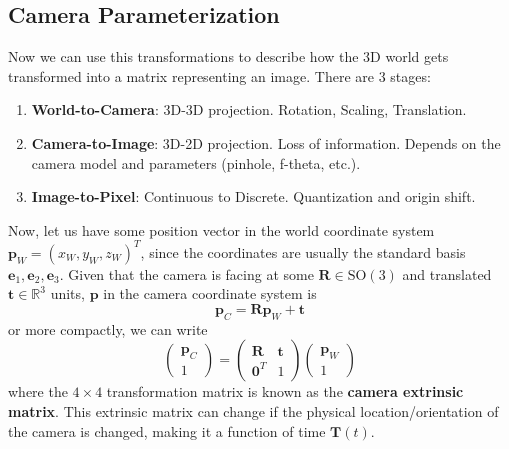 \documentclass{article}
\theoremstyle{definition}
\theoremstyle{remark}
\theoremstyle{definition}
\begin{document}
\subsection{Camera Parameterization}

Now we can use this transformations to describe how the 3D world gets transformed into a matrix representing an image. There are 3 stages: 
\begin{enumerate}
    \item \textbf{World-to-Camera}: 3D-3D projection. Rotation, Scaling, Translation. 
    \item \textbf{Camera-to-Image}: 3D-2D projection. Loss of information. Depends on the camera model and parameters (pinhole, f-theta, etc.). 
    \item \textbf{Image-to-Pixel}: Continuous to Discrete. Quantization and origin shift. 
\end{enumerate}

Now, let us have some position vector in the world coordinate system $\mathbf{p}_W = (x_W, y_W, z_W)^T$, since the coordinates are usually the standard basis $\mathbf{e}_1, \mathbf{e}_2, \mathbf{e}_3$. Given that the camera is facing at some $\mathbf{R} \in \mathrm{SO}(3)$ and translated $\mathbf{t} \in \mathbb{R}^3$ units, $\mathbf{p}$ in the camera coordinate system is 
\[\mathbf{p}_C = \mathbf{R} \mathbf{p}_W + \mathbf{t}\]
or more compactly, we can write 
\[\begin{pmatrix} \mathbf{p}_C \\ 1 \end{pmatrix} = \begin{pmatrix} \mathbf{R} & \mathbf{t} \\ \mathbf{0}^T & 1 \end{pmatrix} \begin{pmatrix} \mathbf{p}_W \\ 1 \end{pmatrix}\]
where the $4 \times 4$ transformation matrix is known as the \textbf{camera extrinsic matrix}. This extrinsic matrix can change if the physical location/orientation of the camera is changed, making it a function of time $\mathbf{T}(t)$. 
\end{document}
